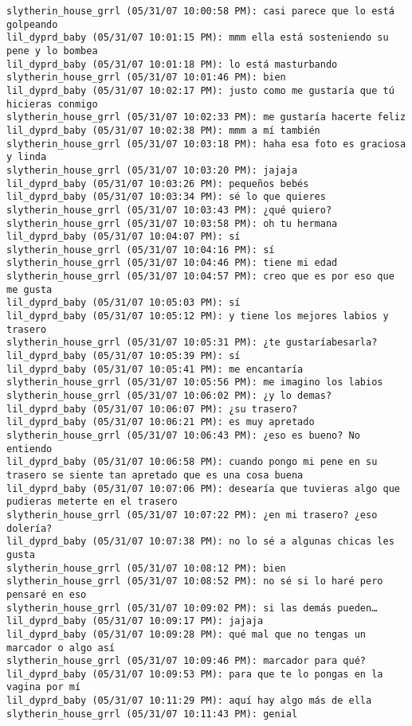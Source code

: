 \begin{verbatim}
slytherin_house_grrl (05/31/07 10:00:58 PM): casi parece que lo está golpeando
lil_dyprd_baby (05/31/07 10:01:15 PM): mmm ella está sosteniendo su pene y lo bombea
lil_dyprd_baby (05/31/07 10:01:18 PM): lo está masturbando
slytherin_house_grrl (05/31/07 10:01:46 PM): bien
lil_dyprd_baby (05/31/07 10:02:17 PM): justo como me gustaría que tú hicieras conmigo
slytherin_house_grrl (05/31/07 10:02:33 PM): me gustaría hacerte feliz
lil_dyprd_baby (05/31/07 10:02:38 PM): mmm a mí también
slytherin_house_grrl (05/31/07 10:03:18 PM): haha esa foto es graciosa y linda
slytherin_house_grrl (05/31/07 10:03:20 PM): jajaja
lil_dyprd_baby (05/31/07 10:03:26 PM): pequeños bebés
lil_dyprd_baby (05/31/07 10:03:34 PM): sé lo que quieres
slytherin_house_grrl (05/31/07 10:03:43 PM): ¿qué quiero?
slytherin_house_grrl (05/31/07 10:03:58 PM): oh tu hermana
lil_dyprd_baby (05/31/07 10:04:07 PM): sí
slytherin_house_grrl (05/31/07 10:04:16 PM): sí
slytherin_house_grrl (05/31/07 10:04:46 PM): tiene mi edad 
slytherin_house_grrl (05/31/07 10:04:57 PM): creo que es por eso que me gusta
lil_dyprd_baby (05/31/07 10:05:03 PM): sí
lil_dyprd_baby (05/31/07 10:05:12 PM): y tiene los mejores labios y trasero
slytherin_house_grrl (05/31/07 10:05:31 PM): ¿te gustaríabesarla?
lil_dyprd_baby (05/31/07 10:05:39 PM): sí
lil_dyprd_baby (05/31/07 10:05:41 PM): me encantaría
slytherin_house_grrl (05/31/07 10:05:56 PM): me imagino los labios
slytherin_house_grrl (05/31/07 10:06:02 PM): ¿y lo demas?
lil_dyprd_baby (05/31/07 10:06:07 PM): ¿su trasero?
lil_dyprd_baby (05/31/07 10:06:21 PM): es muy apretado
slytherin_house_grrl (05/31/07 10:06:43 PM): ¿eso es bueno? No entiendo
lil_dyprd_baby (05/31/07 10:06:58 PM): cuando pongo mi pene en su trasero se siente tan apretado que es una cosa buena
lil_dyprd_baby (05/31/07 10:07:06 PM): desearía que tuvieras algo que pudieras meterte en el trasero
slytherin_house_grrl (05/31/07 10:07:22 PM): ¿en mi trasero? ¿eso dolería?
lil_dyprd_baby (05/31/07 10:07:38 PM): no lo sé a algunas chicas les gusta 
slytherin_house_grrl (05/31/07 10:08:12 PM): bien
slytherin_house_grrl (05/31/07 10:08:52 PM): no sé si lo haré pero pensaré en eso
slytherin_house_grrl (05/31/07 10:09:02 PM): si las demás pueden…
lil_dyprd_baby (05/31/07 10:09:17 PM): jajaja
lil_dyprd_baby (05/31/07 10:09:28 PM): qué mal que no tengas un marcador o algo así
slytherin_house_grrl (05/31/07 10:09:46 PM): marcador para qué?
lil_dyprd_baby (05/31/07 10:09:53 PM): para que te lo pongas en la vagina por mí
lil_dyprd_baby (05/31/07 10:11:29 PM): aquí hay algo más de ella
slytherin_house_grrl (05/31/07 10:11:43 PM): genial

\end{verbatim}
